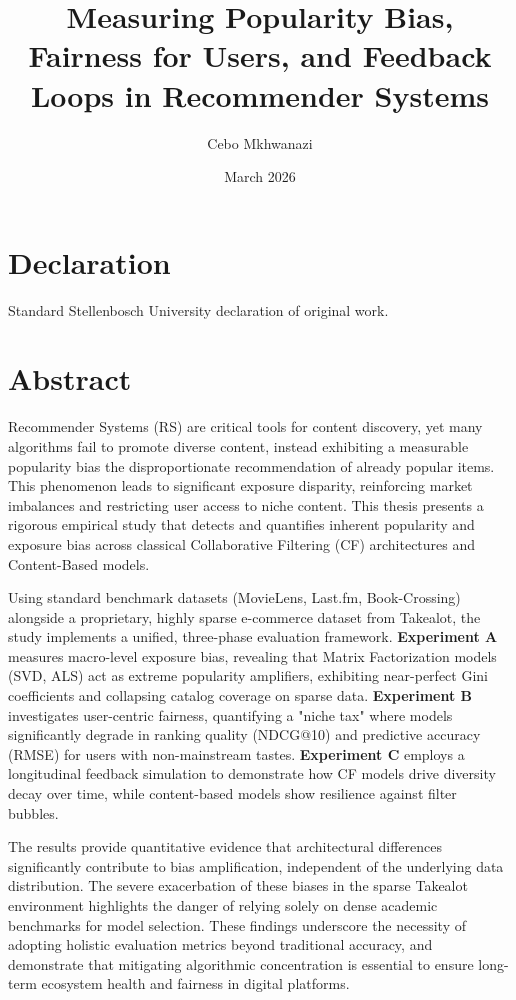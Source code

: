\documentclass[11pt,a4paper]{report}
\title{Measuring Popularity Bias, Fairness for Users, and Feedback Loops in Recommender Systems}
\author{Cebo Mkhwanazi}
\date{March 2026}
\begin{document}

\maketitle

\chapter*{Declaration}
Standard Stellenbosch University declaration of original work.

\chapter*{Abstract}
Recommender Systems (RS) are critical tools for content discovery, yet many algorithms fail to promote diverse content, instead exhibiting a measurable popularity bias the disproportionate recommendation of already popular items. This phenomenon leads to significant exposure disparity, reinforcing market imbalances and restricting user access to niche content. This thesis presents a rigorous empirical study that detects and quantifies inherent popularity and exposure bias across classical Collaborative Filtering (CF) architectures and Content-Based models. 

Using standard benchmark datasets (MovieLens, Last.fm, Book-Crossing) alongside a proprietary, highly sparse e-commerce dataset from Takealot, the study implements a unified, three-phase evaluation framework. \textbf{Experiment A} measures macro-level exposure bias, revealing that Matrix Factorization models (SVD, ALS) act as extreme popularity amplifiers, exhibiting near-perfect Gini coefficients and collapsing catalog coverage on sparse data. \textbf{Experiment B} investigates user-centric fairness, quantifying a "niche tax" where models significantly degrade in ranking quality (NDCG@10) and predictive accuracy (RMSE) for users with non-mainstream tastes. \textbf{Experiment C} employs a longitudinal feedback simulation to demonstrate how CF models drive diversity decay over time, while content-based models show resilience against filter bubbles.

The results provide quantitative evidence that architectural differences significantly contribute to bias amplification, independent of the underlying data distribution. The severe exacerbation of these biases in the sparse Takealot environment highlights the danger of relying solely on dense academic benchmarks for model selection. These findings underscore the necessity of adopting holistic evaluation metrics beyond traditional accuracy, and demonstrate that mitigating algorithmic concentration is essential to ensure long-term ecosystem health and fairness in digital platforms.
\end{document}
